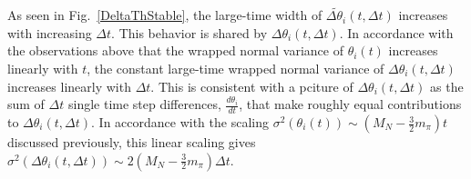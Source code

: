 As seen in Fig.~\ref{DeltaThStable}, 
the large-time width of $\widetilde{\Delta \theta_i}(t, \Delta t)$ increases with increasing $\Delta t$. 
This behavior is shared by $\Delta \theta_i(t, \Delta t)$. 
In accordance with the observations above that the wrapped normal variance of $\theta_i(t)$ increases linearly with $t$, 
the constant large-time wrapped normal variance of $\Delta\theta_i(t, \Delta t)$ increases linearly with $\Delta t$. 
This is consistent with a pciture of $\Delta\theta_i(t,\Delta t)$ as the sum of $\Delta t$ single time step differences, $\frac{d\theta_i}{dt}$, that make roughly equal contributions to $\Delta \theta_i(t, \Delta t)$.
In accordance with the scaling $\sigma^2(\theta_i(t)) \sim (M_N - \frac{3}{2}m_\pi)t$ discussed previously, 
this linear scaling gives $\sigma^2(\Delta \theta_i(t, \Delta t)) \sim 2(M_N - \frac{3}{2}m_\pi)\Delta t$.




